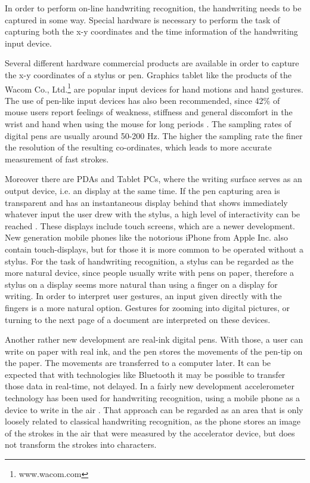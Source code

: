 In order to perform on-line handwriting recognition, the handwriting needs to 
be captured in some way. Special hardware is necessary to perform the task of
capturing both the x-y coordinates and the time information of the handwriting
input device.

Several different hardware commercial products are available in order to
capture the x-y coordinates of a stylus or pen. Graphics tablet like the
products of the Wacom Co., Ltd.\footnote{www.wacom.com} are popular input
devices for hand motions and hand gestures. The use of pen-like input devices 
has also been recommended, since 42\% of mouse users report feelings of 
weakness, stiffness and general discomfort in the wrist and hand when 
using the mouse for long periods . 
The sampling rates of digital pens are usually around 50-200 Hz. The higher the
sampling rate the finer the resolution of the resulting co-ordinates,
which leads to more accurate measurement of fast strokes. 

Moreover there are PDAs and Tablet PCs, where the writing surface serves 
as an output device, i.e. an display at the same time.
If the pen capturing area is transparent and has an instantaneous display behind
that shows immediately whatever input the user drew with the stylus,
a high level of interactivity can be reached . 
These displays include touch screens, which are a newer development. 
New generation mobile phones like the notorious iPhone from Apple Inc. 
also contain touch-displays, but for those it is more common to be 
operated without a stylus. For the task of handwriting recognition, 
a stylus can be regarded as the more natural device, 
since people usually write with pens on paper,
therefore a stylus on a display seems more natural than using a 
finger on a display for writing. 
In order to interpret user gestures, an input given directly with the fingers
is a more natural option. Gestures for zooming into digital pictures, 
or turning to the next page of a document are interpreted on these devices.

Another rather new development are real-ink digital pens. With those, 
a user can write on paper with real ink, and the pen stores the 
movements of the pen-tip on the paper. The movements are transferred to a 
computer later. 
It can be expected that with technologies like Bluetooth it may be possible 
to transfer those data in real-time, not delayed.
In a fairly new development accelerometer technology has been used 
for handwriting recognition, using a mobile phone as a device to write 
in the air . That approach can be regarded as an area 
that is only loosely related to classical handwriting recognition, 
as the phone stores an image of the strokes in the air that were measured
by the accelerator device, but does not transform the strokes into characters.

